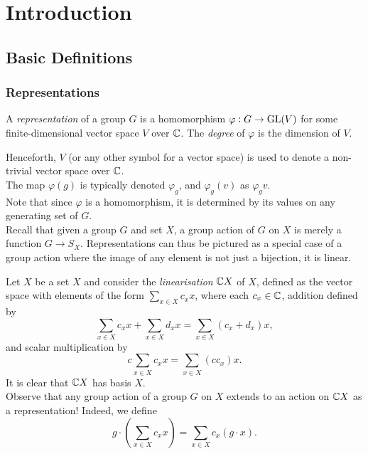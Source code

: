 
\section{Introduction}

	\subsection{Basic Definitions}

		\subsubsection{Representations}

			\begin{fdef}[Representation]
				\label{def: representation}
				A \emph{representation} of a group $G$ is a homomorphism $\varphi : G \to \operatorname{GL}(V)$ for some finite-dimensional vector space $V$ over $\mathbb{C}$. The \emph{degree} of $\varphi$ is the dimension of $V$.
			\end{fdef}
			Henceforth, $V$ (or any other symbol for a vector space) is used to denote a non-trivial vector space over $\mathbb{C}$.\\
			The map $\varphi(g)$ is typically denoted $\varphi_g$, and $\varphi_g(v)$ as $\varphi_gv$.\\
			Note that since $\varphi$ is a homomorphism, it is determined by its values on any generating set of $G$.\\
			Recall that given a group $G$ and set $X$, a group action of $G$ on $X$ is merely a function $G \to S_X$. Representations can thus be pictured as a special case of a group action where the image of any element is not just a bijection, it is linear.

			\begin{fex}
				Let $X$ be a set $X$ and consider the \emph{linearisation} $\mathbb{C} X$ of $X$, defined as the vector space with elements of the form $\sum_{x \in X} c_x x$, where each $c_x \in \mathbb{C}$, addition defined by
				\[ \sum_{x \in X} c_x x + \sum_{x \in X} d_x x = \sum_{x \in X} (c_x + d_x) x, \]
				and scalar multiplication by
				\[ c \sum_{x \in X} c_x x = \sum_{x \in X} (cc_x) x. \]
				It is clear that $\mathbb{C} X$ has basis $X$.\\
				Observe that any group action of a group $G$ on $X$ extends to an action on $\mathbb{C} X$ as a representation! Indeed, we define
				\[ g \cdot \left( \sum_{x \in X} c_x x \right) = \sum_{x \in X} c_x (g\cdot x). \]
			\end{fex}

